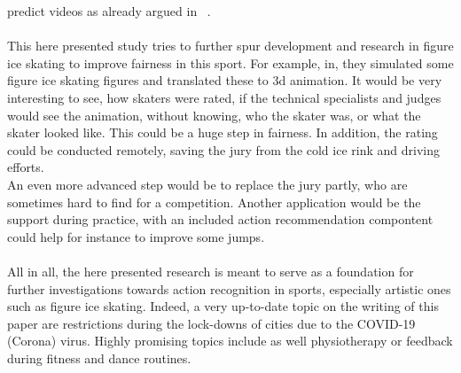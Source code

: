 predict videos as already argued in ~\cite{staf}.
\\\mbox{}\\
This here presented study tries to further spur development and research in figure ice skating to improve
fairness in this sport.
For example, in\cite{figureskatingsimulation}, they simulated some figure ice skating figures and translated these to 3d
animation. It would be very interesting to see, how skaters were rated, if the technical specialists and judges would see
the animation, without knowing, who the skater was, or what the skater looked like.
This could be a huge step in fairness.
In addition, the rating could be conducted remotely, saving the jury from the cold
ice rink and driving efforts.\\
An even more advanced step would be to replace the jury partly, who are sometimes hard to find for a competition.
Another application would be the support during practice, with an included action recommendation compontent could help for instance to improve some jumps.
\\\mbox{}\\
All in all, the here presented research is meant to serve as a foundation for further investigations towards action recognition
in sports, especially artistic ones such as figure ice skating.
Indeed, a very up-to-date topic on the writing of this paper are restrictions during the lock-downs of cities due to the
COVID-19 (Corona) virus.
Highly promising topics include as well physiotherapy or feedback during fitness and dance routines.
